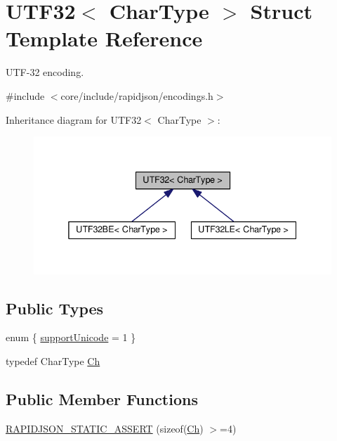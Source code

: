 \hypertarget{structUTF32}{}\section{U\+T\+F32$<$ Char\+Type $>$ Struct Template Reference}
\label{structUTF32}


U\+T\+F-\/32 encoding.  




{\ttfamily \#include $<$core/include/rapidjson/encodings.\+h$>$}



Inheritance diagram for U\+T\+F32$<$ Char\+Type $>$\+:
\nopagebreak
\begin{figure}[H]
\begin{center}
\leavevmode
\includegraphics[width=338pt]{structUTF32__inherit__graph}
\end{center}
\end{figure}
\subsection*{Public Types}
\begin{DoxyCompactItemize}
\item 
enum \{ \hyperlink{structUTF32_abe791c52b9d1305aacf92ddc15c11ab4ae44852fd9d88deed3a956b89108412a5}{support\+Unicode} = 1
 \}
\item 
typedef Char\+Type \hyperlink{structUTF32_ab4502672d56436e730ca5f647bb52be9}{Ch}
\end{DoxyCompactItemize}
\subsection*{Public Member Functions}
\begin{DoxyCompactItemize}
\item 
\hyperlink{structUTF32_aae11b766f799d311679d59e9f7077f83}{R\+A\+P\+I\+D\+J\+S\+O\+N\+\_\+\+S\+T\+A\+T\+I\+C\+\_\+\+A\+S\+S\+E\+RT} (sizeof(\hyperlink{structUTF32_ab4502672d56436e730ca5f647bb52be9}{Ch}) $>$=4)
\end{DoxyCompactItemize}
